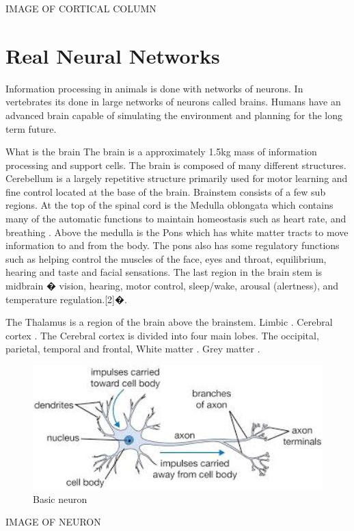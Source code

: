 IMAGE OF CORTICAL COLUMN

\section {Real Neural Networks}

Information processing in animals is done with networks of neurons. In vertebrates its done in large networks of neurons called brains. Humans have an advanced brain capable of simulating the environment and planning for the long term future. 

What is the brain
    The brain is a approximately 1.5kg mass of information processing and support cells. The brain is composed of many different structures. Cerebellum is a largely repetitive structure primarily used for motor learning and fine control located at the base of the brain. Brainstem consists of a few sub regions. At the top of the spinal cord is the Medulla oblongata which contains many of the automatic functions to maintain homeostasis such as heart rate, and breathing . Above the medulla is the Pons which has white matter tracts to move information to and from the body. The pons also has some regulatory functions such as helping control the muscles of the face, eyes and throat, equilibrium, hearing and taste and facial sensations. The last region in the brain stem is midbrain � vision, hearing, motor control, sleep/wake, arousal (alertness), and temperature regulation.[2]�. 

The Thalamus is a region of the brain above the brainstem.
Limbic .
Cerebral cortex .
The Cerebral cortex is divided into four main lobes. The occipital, parietal, temporal and frontal, 
White matter .
Grey matter .

\begin{figure}[h!]
\centering
\includegraphics[width=1.4\textwidth,natwidth=535,natheight=308]{./Figures/Neuron.jpg}
\caption{Basic neuron}
\end{figure}
IMAGE OF NEURON

